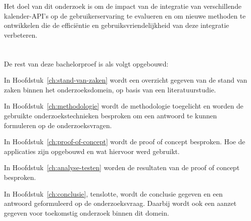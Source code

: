 Het doel van dit onderzoek is om de impact van de integratie van verschillende kalender-API's op de gebruikerservaring te evalueren en om nieuwe methoden te ontwikkelen die de efficiëntie en gebruiksvriendelijkheid van deze integratie verbeteren.

\section{}%
\label{sec:opzet-bachelorproef}


De rest van deze bachelorproef is als volgt opgebouwd:

In Hoofdstuk~\ref{ch:stand-van-zaken} wordt een overzicht gegeven van de stand van zaken binnen het onderzoeksdomein, op basis van een literatuurstudie.

In Hoofdstuk~\ref{ch:methodologie} wordt de methodologie toegelicht en worden de gebruikte onderzoekstechnieken besproken om een antwoord te kunnen formuleren op de onderzoeksvragen.

In Hoofdstuk~\ref{ch:proof-of-concept} wordt de proof of concept besproken. Hoe de applicaties zijn opgebouwd en wat hiervoor werd gebruikt.

In Hoofdstuk~\ref{ch:analyse-testen} worden de resultaten van de proof of concept besproken.

In Hoofdstuk~\ref{ch:conclusie}, tenslotte, wordt de conclusie gegeven en een antwoord geformuleerd op de onderzoeksvraag. Daarbij wordt ook een aanzet gegeven voor toekomstig onderzoek binnen dit domein.